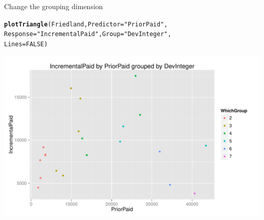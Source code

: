 \documentclass[xcolor=dvipsnames]{beamer}\usepackage{graphicx, color}
\makeatletter
\def\maxwidth{ %
  \ifdim\Gin@nat@width>\linewidth
    \linewidth
  \else
    \Gin@nat@width
  \fi
}
\newcommand{\hlfunctioncall}[1]{\textcolor[rgb]{0.501960784313725,0,0.329411764705882}{\textbf{#1}}}%
\newcommand{\hlstring}[1]{\textcolor[rgb]{0.6,0.6,1}{#1}}%
\newenvironment{kframe}{%
 \def\at@end@of@kframe{}%
 \ifinner\ifhmode%
  \def\at@end@of@kframe{\end{minipage}}%
  \begin{minipage}{\columnwidth}%
 \fi\fi%
 \def\FrameCommand##1{\hskip\@totalleftmargin \hskip-\fboxsep
 \colorbox{shadecolor}{##1}\hskip-\fboxsep
     \hskip-\linewidth \hskip-\@totalleftmargin \hskip\columnwidth}%
 \MakeFramed {\advance\hsize-\width
   \@totalleftmargin\z@ \linewidth\hsize
   \@setminipage}}%
 {\par\unskip\endMakeFramed%
 \at@end@of@kframe}
\newenvironment{knitrout}{}{} %
\makeatother
\begin{document}
\begin{frame}[fragile]{Change the grouping dimension}
\begin{knitrout}
\color{fgcolor}\begin{kframe}
\begin{alltt}
\hlfunctioncall{plotTriangle}(Friedland, Predictor = \hlstring{"PriorPaid"}, 
    Response = \hlstring{"IncrementalPaid"}, Group = \hlstring{"DevInteger"}, 
    Lines = FALSE)
\end{alltt}


{\ttfamily\noindent\color{warningcolor}{\#\# Warning: Removed 7 rows containing missing values (geom\_point).}}\end{kframe}
\includegraphics[width=\maxwidth]{figure/FriedlandCL1} 

\end{knitrout}

\end{frame}
\end{document}
